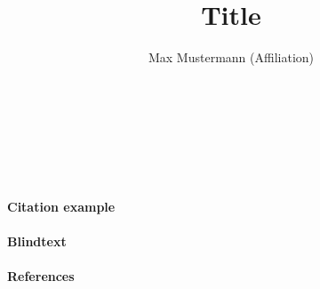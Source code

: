 \documentclass[
12pt,a4paper
]{article}
\author{Max Mustermann (Affiliation)}
\title{Title}
\makeatletter
\renewcommand\maketitle{
  ~\vspace{-1.1cm}\newline
  {\raggedright
    \renewcommand{\baselinestretch}{1.2}\selectfont
  {\bfseries\large\@title}\\[2ex]
  {\large\@author}\\[2ex]
  }
}
\makeatother
\begin{document}
\maketitle

\paragraph{Citation example}



\paragraph{Blindtext} \lipsum

\paragraph{References}
{\tiny
\printbibliography[heading=none]
}
\end{document}
